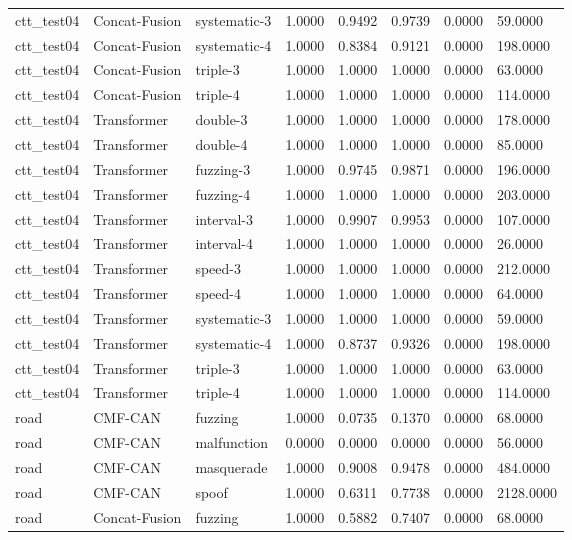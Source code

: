\begin{tabular}{llllllll}
ctt_test04 & Concat-Fusion & systematic-3 & 1.0000 & 0.9492 & 0.9739 & 0.0000 & 59.0000 \\
ctt_test04 & Concat-Fusion & systematic-4 & 1.0000 & 0.8384 & 0.9121 & 0.0000 & 198.0000 \\
ctt_test04 & Concat-Fusion & triple-3 & 1.0000 & 1.0000 & 1.0000 & 0.0000 & 63.0000 \\
ctt_test04 & Concat-Fusion & triple-4 & 1.0000 & 1.0000 & 1.0000 & 0.0000 & 114.0000 \\
ctt_test04 & Transformer & double-3 & 1.0000 & 1.0000 & 1.0000 & 0.0000 & 178.0000 \\
ctt_test04 & Transformer & double-4 & 1.0000 & 1.0000 & 1.0000 & 0.0000 & 85.0000 \\
ctt_test04 & Transformer & fuzzing-3 & 1.0000 & 0.9745 & 0.9871 & 0.0000 & 196.0000 \\
ctt_test04 & Transformer & fuzzing-4 & 1.0000 & 1.0000 & 1.0000 & 0.0000 & 203.0000 \\
ctt_test04 & Transformer & interval-3 & 1.0000 & 0.9907 & 0.9953 & 0.0000 & 107.0000 \\
ctt_test04 & Transformer & interval-4 & 1.0000 & 1.0000 & 1.0000 & 0.0000 & 26.0000 \\
ctt_test04 & Transformer & speed-3 & 1.0000 & 1.0000 & 1.0000 & 0.0000 & 212.0000 \\
ctt_test04 & Transformer & speed-4 & 1.0000 & 1.0000 & 1.0000 & 0.0000 & 64.0000 \\
ctt_test04 & Transformer & systematic-3 & 1.0000 & 1.0000 & 1.0000 & 0.0000 & 59.0000 \\
ctt_test04 & Transformer & systematic-4 & 1.0000 & 0.8737 & 0.9326 & 0.0000 & 198.0000 \\
ctt_test04 & Transformer & triple-3 & 1.0000 & 1.0000 & 1.0000 & 0.0000 & 63.0000 \\
ctt_test04 & Transformer & triple-4 & 1.0000 & 1.0000 & 1.0000 & 0.0000 & 114.0000 \\
road & CMF-CAN & fuzzing & 1.0000 & 0.0735 & 0.1370 & 0.0000 & 68.0000 \\
road & CMF-CAN & malfunction & 0.0000 & 0.0000 & 0.0000 & 0.0000 & 56.0000 \\
road & CMF-CAN & masquerade & 1.0000 & 0.9008 & 0.9478 & 0.0000 & 484.0000 \\
road & CMF-CAN & spoof & 1.0000 & 0.6311 & 0.7738 & 0.0000 & 2128.0000 \\
road & Concat-Fusion & fuzzing & 1.0000 & 0.5882 & 0.7407 & 0.0000 & 68.0000 \\

\end{tabular}
